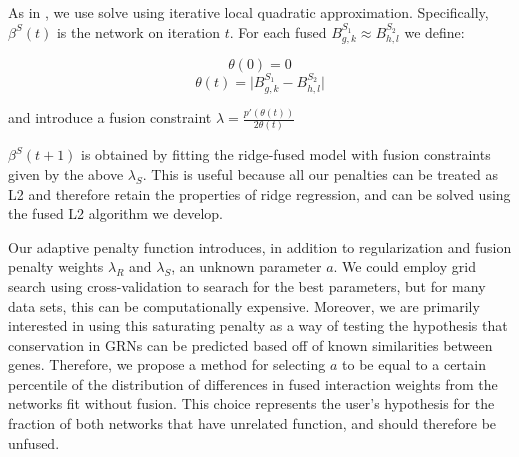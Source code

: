 \documentclass[11pt]{article}
\begin{document}

    
As in \cite{fan2001variable}, we use solve using iterative local quadratic approximation. Specifically, $\beta^S(t)$ is the network on iteration $t$. For each fused $B^{S_1}_{g,k} \approx B^{S_2}_{h,l}$ we define:

\begin{equation} 
\theta(0)=0
\end{equation}
\begin{equation}
\theta(t) = \vert B^{S_1}_{g,k} - B^{S_2}_{h,l} \vert
\end{equation}

and introduce a fusion constraint $\lambda = \frac{p'(\theta(t))}{2\theta(t)} $

$\beta^S(t+1)$ is obtained by fitting the ridge-fused model with fusion constraints given by the above $\lambda_S$. This is useful because all our penalties can be treated as L2 and therefore retain the properties of ridge regression, and can be solved using the fused L2 algorithm we develop.

Our adaptive penalty function introduces, in addition to regularization and fusion penalty weights $\lambda_R$ and $\lambda_S$, an unknown parameter $a$. We could employ grid search using cross-validation to searach for the best parameters, but for many data sets, this can be computationally expensive. Moreover, we are primarily interested in using this saturating penalty as a way of testing the hypothesis that conservation in GRNs can be predicted based off of known similarities between genes. Therefore, we propose a method for selecting $a$ to be equal to a certain percentile of the distribution of differences in fused interaction weights from the networks fit without fusion. This choice represents the user's hypothesis for the fraction of both networks that have unrelated function, and should therefore be unfused. 

\end{document}
